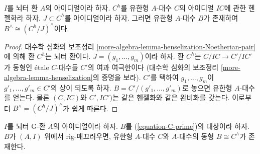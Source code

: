 \begin{lemma}
\label{lemma-algebraize-easy}
$I$를 뇌터 환 $A$의 아이디얼이라 하자.
$C^h$를 유한형 $A$-대수 $C$의 아이디얼 $IC$에 관한 헨젤화라 하자.
$J \subset C^h$를 아이디얼이라 하자.
그러면 유한형 $A$-대수 $B$가 존재하여 $B^\wedge \cong (C^h/J)^\wedge$이다.
\end{lemma}

\begin{proof}
대수학 심화의 보조정리 \ref{more-algebra-lemma-henselization-Noetherian-pair}에 의해
환 $C^h$는 뇌터 환이다. $J = (g_1, \ldots, g_m)$이라 하자.
환 $C^h$는 $C/IC \to C'/IC'$가 동형인 \'etale $C$-대수들 $C'$의 여과 여극한이다
(대수학 심화의 보조정리 \ref{more-algebra-lemma-henselization}의 증명을 보라).
$C'$를 택하여 $g_1, \ldots, g_m$이 $g'_1, \ldots, g'_m \in C'$의 상이 되도록 하자.
$B = C'/(g'_1, \ldots, g'_m)$로 놓으면 유한형 $A$-대수를 얻는다.
물론 $(C, IC)$와 $C', IC')$는 같은 헨젤화와 같은 완비화를 갖는다.
이로부터 $B^\wedge = (C^h/J)^\wedge$가 쉽게 따른다.
\end{proof}

\begin{proposition}
\label{proposition-approximate}
$I$를 뇌터 G-환 $A$의 아이디얼이라 하자.
$B$를 (\ref{equation-C-prime})의 대상이라 하자.
$B$가 $(A, I)$ 위에서 rig-매끄러우면, 유한형 $A$-대수 $C$와
$A$-대수의 동형 $B \cong C^\wedge$가 존재한다.
\end{proposition}

